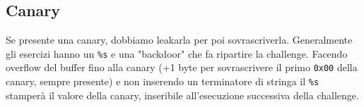 \subsection{Canary}

Se presente una canary, dobbiamo leakarla per poi sovrascriverla. Generalmente gli esercizi hanno un \texttt{\%s} e una "backdoor" che fa ripartire la challenge. Facendo overflow del buffer fino alla canary (+1 byte per sovrascrivere il primo \texttt{0x00} della canary, sempre presente) e non inserendo un terminatore di stringa il \texttt{\%s} stamperà il valore della canary, inseribile all'esecuzione successiva della challenge.\\
